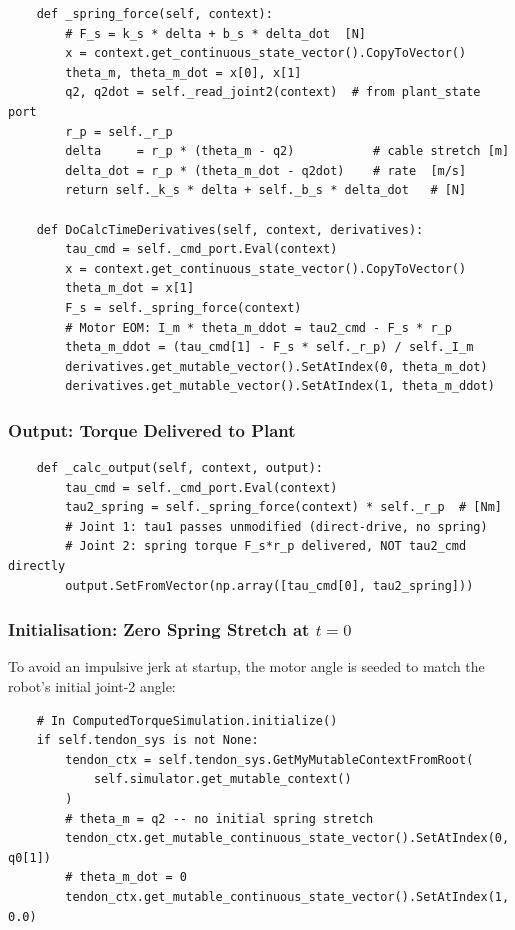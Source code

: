 \documentclass[11pt, a4paper]{article}
\begin{document}
\begin{lstlisting}
    def _spring_force(self, context):
        # F_s = k_s * delta + b_s * delta_dot  [N]
        x = context.get_continuous_state_vector().CopyToVector()
        theta_m, theta_m_dot = x[0], x[1]
        q2, q2dot = self._read_joint2(context)  # from plant_state port
        r_p = self._r_p
        delta     = r_p * (theta_m - q2)           # cable stretch [m]
        delta_dot = r_p * (theta_m_dot - q2dot)    # rate  [m/s]
        return self._k_s * delta + self._b_s * delta_dot   # [N]

    def DoCalcTimeDerivatives(self, context, derivatives):
        tau_cmd = self._cmd_port.Eval(context)
        x = context.get_continuous_state_vector().CopyToVector()
        theta_m_dot = x[1]
        F_s = self._spring_force(context)
        # Motor EOM: I_m * theta_m_ddot = tau2_cmd - F_s * r_p
        theta_m_ddot = (tau_cmd[1] - F_s * self._r_p) / self._I_m
        derivatives.get_mutable_vector().SetAtIndex(0, theta_m_dot)
        derivatives.get_mutable_vector().SetAtIndex(1, theta_m_ddot)
\end{lstlisting}

\subsubsection{Output: Torque Delivered to Plant}

\begin{lstlisting}
    def _calc_output(self, context, output):
        tau_cmd = self._cmd_port.Eval(context)
        tau2_spring = self._spring_force(context) * self._r_p  # [Nm]
        # Joint 1: tau1 passes unmodified (direct-drive, no spring)
        # Joint 2: spring torque F_s*r_p delivered, NOT tau2_cmd directly
        output.SetFromVector(np.array([tau_cmd[0], tau2_spring]))
\end{lstlisting}

\subsubsection{Initialisation: Zero Spring Stretch at $t=0$}

To avoid an impulsive jerk at startup, the motor angle is seeded to match the
robot's initial joint-2 angle:

\begin{lstlisting}
    # In ComputedTorqueSimulation.initialize()
    if self.tendon_sys is not None:
        tendon_ctx = self.tendon_sys.GetMyMutableContextFromRoot(
            self.simulator.get_mutable_context()
        )
        # theta_m = q2 -- no initial spring stretch
        tendon_ctx.get_mutable_continuous_state_vector().SetAtIndex(0, q0[1])
        # theta_m_dot = 0
        tendon_ctx.get_mutable_continuous_state_vector().SetAtIndex(1, 0.0)
\end{lstlisting}
\end{document}
